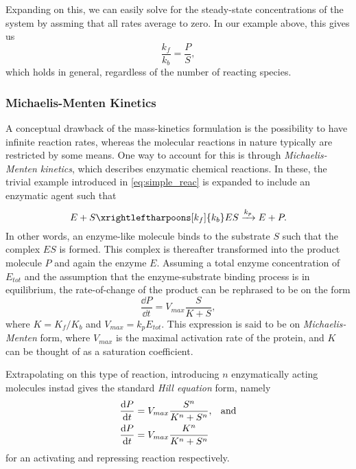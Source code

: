 Expanding on this, we can easily solve for the steady-state concentrations of
the system by assming that all rates average to zero. In our example above, this
gives us 
\begin{equation}
  \frac{k_f}{k_b} = \frac{P}{S},
  \label{eq:mass_action_ss}
\end{equation}
which holds in general, regardless of the number of reacting species.

\subsubsection[Michaelis-Menten Kinetics]{Michaelis-Menten Kinetics}
A conceptual drawback of the mass-kinetics formulation is the possibility to
have infinite reaction rates, whereas the molecular reactions in nature typically
are restricted by some means. One way to account for this is through
\textit{Michaelis-Menten kinetics}, which describes enzymatic chemical
reactions. In these, the trivial example introduced in \cref{eq:simple_reac} is
expanded to include an enzymatic agent such that
\begin{equation}
  E + S \xrightleftharpoons[k_f]{k_b} ES \xrightarrow{k_p} E + P.
  \label{eq:enzymatic_react}
\end{equation}
In other words, an enzyme-like molecule binds to the substrate $S$ such that the
complex $ES$ is formed. This complex is thereafter transformed into the product
molecule $P$ and again the enzyme $E$. Assuming a total enzyme concentration of
$E_{tot}$ and the assumption that the enzyme-substrate binding process is in
equilibrium, the rate-of-change of the product can be rephrased to be on the
form 
\begin{equation}
  \frac{\dd P}{\dd t} = V_{max} \frac{S}{K + S},
  \label{eq:michaelis-menten}
\end{equation}
where $K = K_f / K_b$ and $V_{max} = k_pE_{tot}$. This expression is said to be
on \textit{Michaelis-Menten} form, where $V_{max}$ is the maximal
activation rate of the protein, and $K$ can be thought of as a saturation
coefficient.

Extrapolating on this type of reaction, introducing $n$ enzymatically acting
molecules instad gives the standard \textit{Hill equation} form, namely
\begin{align}
  \frac{\dd P}{\dd t} &= V_{max} \frac{S^n}{K^n + S^n},\hspace{.8em} \text{and} \\
  \frac{\dd P}{\dd t} &= V_{max} \frac{K^n}{K^n + S^n}
  \label{eq:hill}
\end{align}
for an activating and repressing reaction respectively.

